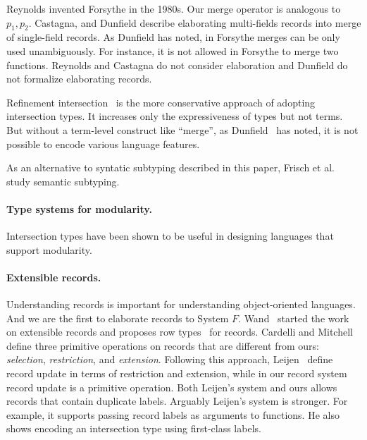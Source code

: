 Reynolds invented Forsythe in the 1980s. Our merge operator is analogous to
$ p_1, p_2 $. Castagna, and Dunfield describe elaborating multi-fields records
into merge of single-field records. As Dunfield has noted, in Forsythe merges
can be only used unambiguously.
For instance, it is not allowed in Forsythe to
merge two functions. Reynolds and Castagna do not consider elaboration and
Dunfield do not formalize elaborating records.


Refinement intersection~\cite{dunfield2007refined,freeman1991refinement} is the
more conservative approach of adopting intersection types. It increases only the
expressiveness of types but not terms. But without a term-level construct like
``merge'', as Dunfield~\cite{dunfield2014elaborating} has noted, it is not
possible to encode various language features. \cite{davies2005practical}
\cite{dunfield2007refined}

As an alternative to syntatic subtyping described in this paper, Frisch et
al.~\cite{frisch2008semantic} study semantic subtyping.

\paragraph{Type systems for modularity.}

Intersection types have been shown to be useful in designing languages that
support modularity.~\cite{nystrom2006j}

\paragraph{Extensible records.}

Understanding records is important for understanding object-oriented languages.
And we are the first to elaborate records to System $ F $.
Wand~\cite{wand1987complete} started the work on extensible records and proposes
row types~\cite{wand1989type} for records. Cardelli and
Mitchell~\cite{cardelli1990operations} define three primitive operations on
records that are different from ours: \emph{selection}, \emph{restriction}, and
\emph{extension}. Following this approach, Leijen~\cite{leijen2005extensible}
define record update in terms of restriction and extension, while in our record
system record update is a primitive operation. Both Leijen's system and ours
allows records that contain duplicate labels. Arguably Leijen's system is
stronger. For example, it supports passing record labels as arguments to
functions. He also shows encoding an intersection type using first-class labels.

